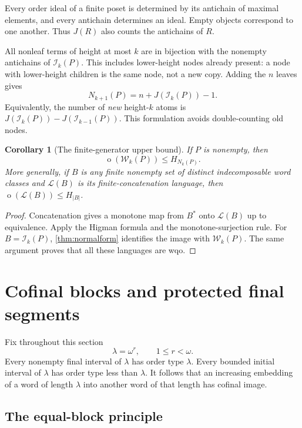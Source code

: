 \documentclass[11pt,letterpaper]{article}
\newtheorem{corollary}[corollary]{Corollary}
\theoremstyle{definition}
\theoremstyle{remark}
\newcommand{\W}{\mathcal W}
\newcommand{\I}{\mathcal I}
\newcommand{\Lcal}{\mathcal L}
\newcommand{\otp}{\operatorname{o}}
\begin{document}
Every order ideal of a finite poset is determined by its antichain of
maximal elements, and every antichain determines an ideal. Empty objects
correspond to one another. Thus $J(R)$ also counts the antichains of $R$.

All nonleaf terms of height at most $k$ are in bijection with the nonempty
antichains of $\I_k(P)$. This includes lower-height nodes already present:
a node with lower-height children is the same node, not a new copy.
Adding the $n$ leaves gives
\begin{equation}\label{eq:count}
  N_{k+1}(P)=n+J(\I_k(P))-1.
\end{equation}
Equivalently, the number of \emph{new} height-$k$ atoms is
$J(\I_k(P))-J(\I_{k-1}(P))$. This formulation avoids double-counting old nodes.

\begin{corollary}[The finite-generator upper bound]\label{cor:upper}
If $P$ is nonempty, then
\[
  \otp(\W_k(P))\le H_{N_k(P)}.
\]
More generally, if $B$ is any finite nonempty set of distinct indecomposable
word classes and $\Lcal(B)$ is its finite-concatenation language, then
$\otp(\Lcal(B))\le H_{|B|}$.
\end{corollary}

\begin{proof}
Concatenation gives a monotone map from $B^*$ onto $\Lcal(B)$ up to
equivalence. Apply the Higman formula and the monotone-surjection rule.
For $B=\I_k(P)$, \cref{thm:normalform} identifies the image with $\W_k(P)$.
The same argument proves that all these languages are wqo.
\end{proof}

\section{Cofinal blocks and protected final segments}\label{sec:blocks}

Fix throughout this section
\[
  \lambda=\omega^r,\qquad 1\le r<\omega.
\]
Every nonempty final interval of $\lambda$ has order type $\lambda$.
Every bounded initial interval of $\lambda$ has order type less than
$\lambda$. It follows that an increasing embedding of a word of length
$\lambda$ into another word of that length has cofinal image.

\subsection{The equal-block principle}
\end{document}
